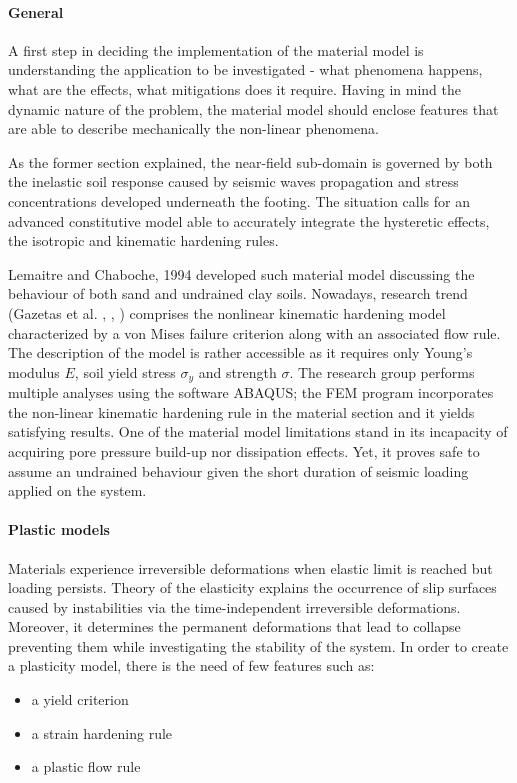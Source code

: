 \documentclass[12pt,a4paper]{report}
\begin{document}
\paragraph{General} A first step in deciding the implementation of the material model is understanding the application to be investigated - what phenomena happens, what are the effects, what mitigations does it require. Having in mind the dynamic nature of the problem, the material model should enclose features that are able to describe mechanically the non-linear phenomena. 

As the former section explained, the near-field sub-domain is governed by both the inelastic soil response caused by seismic waves propagation and stress concentrations developed underneath the footing. The situation calls for an advanced constitutive model able to accurately integrate the hysteretic effects, the isotropic and kinematic hardening rules.

Lemaitre and Chaboche, 1994 \cite{lemaitre1994mechanics} developed such material model discussing the behaviour of both sand and undrained clay soils. Nowadays, research trend (Gazetas et al. \cite{gazetas2004nonlinear}, \cite{gazetas2013nonlinear}, \cite{anastasopoulos2010soil}) comprises the nonlinear kinematic hardening model characterized by a von Mises failure criterion along with an associated flow rule. The description of the model is rather accessible as it requires only Young's modulus $E$, soil yield stress $\sigma_y$ and strength $\sigma$. The research group performs multiple analyses using the software ABAQUS; the FEM program incorporates the non-linear kinematic hardening rule in the material section and it yields satisfying results. One of the material model limitations stand in its incapacity of acquiring pore pressure build-up nor dissipation effects. Yet, it proves safe to assume an undrained behaviour given the short duration of seismic loading applied on the system.   

\paragraph{Plastic models} Materials experience irreversible deformations when elastic limit is reached but loading persists. Theory of the elasticity explains the occurrence of slip surfaces caused by instabilities via the time-independent irreversible deformations. Moreover, it determines the permanent deformations that lead to collapse preventing them while investigating the stability of the system. 
In order to create a plasticity model, there is the need of few features such as:
\begin{itemize}
	\item a yield criterion\
	\item a strain hardening rule\
	\item a plastic flow rule\
\end{itemize}
\end{document}
